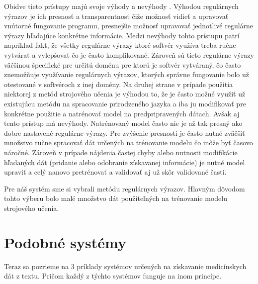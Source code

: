 Obidve tieto prístupy majú svoje výhody a nevýhody \cite{nlpAndRegex}. 
Výhodou regulárnych výrazov je ich presnosť a 
transparentnosť čiže možnosť vidieť a upravovať
vnútorné fungovanie programu, presnejšie možnosť 
upravovať jednotlivé regulárne výrazy
hľadajúce konkrétne informácie. Medzi nevýhody tohto prístupu patrí
napríklad fakt, že všetky regulárne výrazy ktoré softvér využíva 
treba ručne vytvárať a vylepšovať
čo je často komplikované. Zároveň sú tieto regulárne výrazy väčšinou špecifické pre určitú doménu
pre ktorú je softvér vytváraný, čo často znemožňuje využívanie
regulárnych výrazov, ktorých správne fungovanie bolo už 
otestované v softvéroch z inej domény.  
Na druhej strane v prípade použitia niektorej
z metód strojového učenia je výhodou to, že je často možné využiť už 
existujúcu metódu na spracovanie prirodzeného jazyka a iba ju
modifikovať pre konkrétne použitie a natrénovať
model na predpripravených dátach. Avšak aj tento prístup
má nevýhody. Natrénovaný model často nie je až tak presný 
ako dobre nastavené regulárne výrazy. Pre zvýšenie presnosti je často nutné zväčšiť množstvo ručne spracovať dát určených na trénovanie modelu čo môže byť časovo náročné. Zároveň v prípade nájdenia častej chyby alebo nutnosti modifikácie hľadaných dát (pridanie alebo odobranie získavanej informácie) je nutné model upraviť a celý nanovo pretrénovať a validovať aj už skôr validované časti.

Pre náš systém sme si vybrali metódu regulárnych výrazov. Hlavným dôvodom tohto výberu bolo malé množstvo dát použiteľných na trénovanie modelu strojového učenia. 

\section{Podobné systémy}

Teraz sa pozrieme na 3 príklady systémov určených na získavanie medicínskych dát z textu. Pričom každý z týchto systémov funguje na inom princípe.

